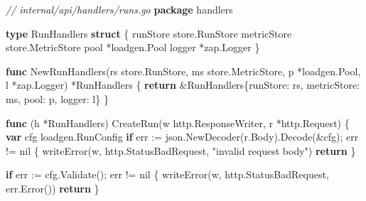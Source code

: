 \documentclass[
]{article}
\newenvironment{Shaded}{}{}
\newcommand{\CommentTok}[1]{\textcolor[rgb]{0.38,0.63,0.69}{\textit{#1}}}
\newcommand{\ControlFlowTok}[1]{\textcolor[rgb]{0.00,0.44,0.13}{\textbf{#1}}}
\newcommand{\KeywordTok}[1]{\textcolor[rgb]{0.00,0.44,0.13}{\textbf{#1}}}
\newcommand{\NormalTok}[1]{#1}
\newcommand{\OperatorTok}[1]{\textcolor[rgb]{0.40,0.40,0.40}{#1}}
\newcommand{\OtherTok}[1]{\textcolor[rgb]{0.00,0.44,0.13}{#1}}
\newcommand{\StringTok}[1]{\textcolor[rgb]{0.25,0.44,0.63}{#1}}
\begin{document}
\begin{Shaded}
\begin{Highlighting}[]
\CommentTok{// internal/api/handlers/runs.go}
\KeywordTok{package}\NormalTok{ handlers}

\KeywordTok{type}\NormalTok{ RunHandlers }\KeywordTok{struct} \OperatorTok{\{}
\NormalTok{    runStore  store}\OperatorTok{.}\NormalTok{RunStore}
\NormalTok{    metricStore store}\OperatorTok{.}\NormalTok{MetricStore}
\NormalTok{    pool      }\OperatorTok{*}\NormalTok{loadgen}\OperatorTok{.}\NormalTok{Pool}
\NormalTok{    logger    }\OperatorTok{*}\NormalTok{zap}\OperatorTok{.}\NormalTok{Logger}
\OperatorTok{\}}

\KeywordTok{func}\NormalTok{ NewRunHandlers}\OperatorTok{(}\NormalTok{rs store}\OperatorTok{.}\NormalTok{RunStore}\OperatorTok{,}\NormalTok{ ms store}\OperatorTok{.}\NormalTok{MetricStore}\OperatorTok{,}\NormalTok{ p }\OperatorTok{*}\NormalTok{loadgen}\OperatorTok{.}\NormalTok{Pool}\OperatorTok{,}\NormalTok{ l }\OperatorTok{*}\NormalTok{zap}\OperatorTok{.}\NormalTok{Logger}\OperatorTok{)} \OperatorTok{*}\NormalTok{RunHandlers }\OperatorTok{\{}
    \ControlFlowTok{return} \OperatorTok{\&}\NormalTok{RunHandlers}\OperatorTok{\{}\NormalTok{runStore}\OperatorTok{:}\NormalTok{ rs}\OperatorTok{,}\NormalTok{ metricStore}\OperatorTok{:}\NormalTok{ ms}\OperatorTok{,}\NormalTok{ pool}\OperatorTok{:}\NormalTok{ p}\OperatorTok{,}\NormalTok{ logger}\OperatorTok{:}\NormalTok{ l}\OperatorTok{\}}
\OperatorTok{\}}

\KeywordTok{func} \OperatorTok{(}\NormalTok{h }\OperatorTok{*}\NormalTok{RunHandlers}\OperatorTok{)}\NormalTok{ CreateRun}\OperatorTok{(}\NormalTok{w http}\OperatorTok{.}\NormalTok{ResponseWriter}\OperatorTok{,}\NormalTok{ r }\OperatorTok{*}\NormalTok{http}\OperatorTok{.}\NormalTok{Request}\OperatorTok{)} \OperatorTok{\{}
    \KeywordTok{var}\NormalTok{ cfg loadgen}\OperatorTok{.}\NormalTok{RunConfig}
    \ControlFlowTok{if}\NormalTok{ err }\OperatorTok{:=}\NormalTok{ json}\OperatorTok{.}\NormalTok{NewDecoder}\OperatorTok{(}\NormalTok{r}\OperatorTok{.}\NormalTok{Body}\OperatorTok{).}\NormalTok{Decode}\OperatorTok{(\&}\NormalTok{cfg}\OperatorTok{);}\NormalTok{ err }\OperatorTok{!=} \OtherTok{nil} \OperatorTok{\{}
\NormalTok{        writeError}\OperatorTok{(}\NormalTok{w}\OperatorTok{,}\NormalTok{ http}\OperatorTok{.}\NormalTok{StatusBadRequest}\OperatorTok{,} \StringTok{"invalid request body"}\OperatorTok{)}
        \ControlFlowTok{return}
    \OperatorTok{\}}

    \ControlFlowTok{if}\NormalTok{ err }\OperatorTok{:=}\NormalTok{ cfg}\OperatorTok{.}\NormalTok{Validate}\OperatorTok{();}\NormalTok{ err }\OperatorTok{!=} \OtherTok{nil} \OperatorTok{\{}
\NormalTok{        writeError}\OperatorTok{(}\NormalTok{w}\OperatorTok{,}\NormalTok{ http}\OperatorTok{.}\NormalTok{StatusBadRequest}\OperatorTok{,}\NormalTok{ err}\OperatorTok{.}\NormalTok{Error}\OperatorTok{())}
        \ControlFlowTok{return}
    \OperatorTok{\}}


\end{Highlighting}
\end{Shaded}
\end{document}
